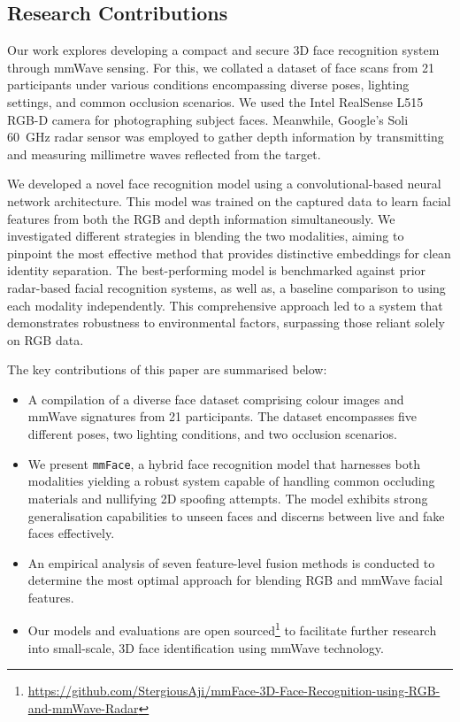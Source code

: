 \documentclass{mpaper}
\begin{document}
\vspace{0.2cm}
\subsection{Research Contributions}
Our work explores developing a compact and secure 3D face recognition system through mmWave sensing. For this, we collated a dataset of face scans from 21 participants under various conditions encompassing diverse poses, lighting settings, and common occlusion scenarios. We used the Intel RealSense L515 RGB-D camera \cite{intel-l515} for photographing subject faces. Meanwhile, Google's Soli \qty{60}{\GHz} radar sensor \cite{lien2016soli} was employed to gather depth information by transmitting and measuring millimetre waves reflected from the target. 

We developed a novel face recognition model using a \linebreak convolutional-based neural network architecture. This model was trained on the captured data to learn facial features from both the RGB and depth information simultaneously. We investigated different strategies in blending the two modalities, aiming to pinpoint the most effective method that provides distinctive embeddings for clean identity separation. The best-performing model is benchmarked against prior radar-based facial recognition systems, as well as, a baseline comparison to using each modality independently. This comprehensive approach led to a system that demonstrates robustness to environmental factors, surpassing those reliant solely on RGB data.

The key contributions of this paper are summarised below:
\vspace{-0.5cm}
\begin{itemize}
    \itemsep 0.08cm
    \item A compilation of a diverse face dataset comprising colour images and mmWave signatures from 21 participants. The dataset encompasses five different poses, two lighting conditions, and two occlusion scenarios.
    \item We present \texttt{mmFace}, a hybrid face recognition model that harnesses both modalities yielding a robust system capable of handling common occluding materials and nullifying 2D spoofing attempts. The model exhibits strong generalisation capabilities to unseen faces and discerns between live and fake faces effectively.
    \item An empirical analysis of seven feature-level fusion methods is conducted to determine the most optimal approach for blending RGB and mmWave facial features.
    \item Our models and evaluations are open sourced\footnote{\url{https://github.com/StergiousAji/mmFace-3D-Face-Recognition-using-RGB-and-mmWave-Radar}} to facilitate further research into small-scale, 3D face identification using mmWave technology.
\end{itemize}
\vspace{6pt}
\end{document}

